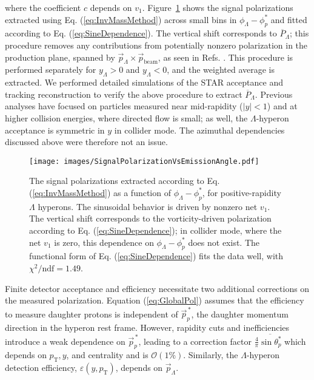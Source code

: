 \documentclass[
  reprint,
  superscriptaddress,
  amsmath,
  amssymb,
  aps,
  floatfix,
]{revtex4-2}
\newcommand{\proton}{p}
\newcommand{\pT}{p_\mathrm{T}}
\newcommand{\pstar}{_\proton^{*}}
\newcommand{\PpStar}{\vec{p}_\proton^{\,*}} %
\newcommand{\PLambda}{\overline{P}_{\Lambda}}
\newcommand{\AzimuthalEmissionAngle}{\phi_\Lambda-\phi\pstar}
\newcommand{\Efficiency}{\varepsilon\left(y,p_\mathrm{T}\right)}
\newcommand{\AZero}{\tfrac{4}{\pi}\overline{\sin\theta\pstar}}
\begin{document}
where the coefficient $c$ depends on
 $v_1$. Figure~\ref{fig:SignalPolarizationVsEmissionAngle} shows the signal polarizations
 extracted using Eq. (\ref{eq:InvMassMethod}) across small bins
 in $\AzimuthalEmissionAngle$ and fitted according to
 Eq. (\ref{eq:SineDependence}). The vertical shift corresponds to
 $\PLambda$; this procedure removes any contributions
 from potentially nonzero polarization in the
 production plane, spanned by $\vec{p}_\Lambda\times\vec{p}_\mathrm{beam}$, as
 seen in Refs. \cite{Lesnik:1975my,Bunce:1976yb}. This procedure is performed
 separately for $y_\Lambda>0$ and $y_\Lambda<0$, and
 the weighted average is extracted. We
 performed detailed simulations of the
 STAR acceptance and tracking reconstruction to
 verify the above procedure to extract
 $\PLambda$. Previous analyses\cite{Abelev:2007zk,STAR:2017ckg,Adam:2018ivw,Acharya:2019ryw} have focused on
 particles measured near mid-rapidity ($|y|<1$) and
 at higher collision energies, where directed
 flow\cite{Poskanzer:1998yz} is small; as well, the
 $\Lambda$-hyperon acceptance is symmetric in $y$
 in collider mode. The azimuthal dependencies
 discussed above were therefore not an issue.

\begin{figure}
  \centering
  \texttt{[image: images/SignalPolarizationVsEmissionAngle.pdf]}
  \caption{The signal polarizations extracted according
 to Eq. (\ref{eq:InvMassMethod}) as a function of
 $\AzimuthalEmissionAngle$, for positive-rapidity $\Lambda$ hyperons. The
 sinusoidal behavior is driven by nonzero
 net $v_1$. The vertical shift corresponds
 to the vorticity-driven polarization according to
 Eq. (\ref{eq:SineDependence}); in collider mode, where the
 net $v_1$ is zero, this dependence
 on $\AzimuthalEmissionAngle$ does not exist.
 The functional form of Eq. (\ref{eq:SineDependence}) fits the data well, 
 with $\chi^2/\mathrm{ndf}=1.49$.}
  \label{fig:SignalPolarizationVsEmissionAngle}
\end{figure}

Finite detector acceptance and efficiency necessitate
 two additional corrections on the measured
 polarization. Equation (\ref{eq:GlobalPol}) assumes that the efficiency
 to measure daughter protons is independent
 of $\PpStar$, the daughter momentum direction
 in the hyperon rest frame. However,
 rapidity cuts and inefficiencies introduce a
 weak dependence on $\PpStar$, leading to
 a correction factor $\AZero$\cite{Abelev:2007zk} which depends
 on $\pT, y$, and centrality and
 is $\mathcal{O}(1\%)$. Similarly, the $\Lambda$-hyperon detection
 efficiency, $\Efficiency$, depends on $\vec{p}_\Lambda$.
\end{document}
